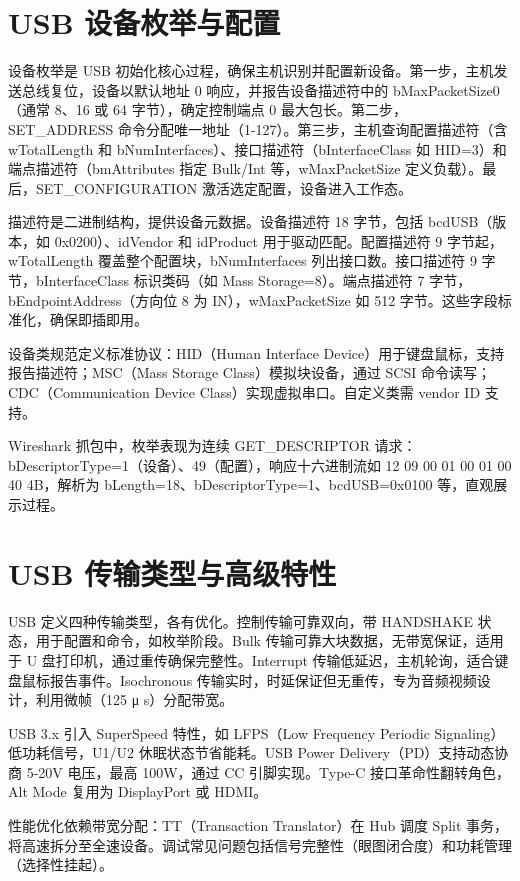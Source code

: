\chapter{USB 设备枚举与配置}
设备枚举是 USB 初始化核心过程，确保主机识别并配置新设备。第一步，主机发送总线复位，设备以默认地址 0 响应，并报告设备描述符中的 bMaxPacketSize0（通常 8、16 或 64 字节），确定控制端点 0 最大包长。第二步，SET\_{}ADDRESS 命令分配唯一地址（1-127）。第三步，主机查询配置描述符（含 wTotalLength 和 bNumInterfaces）、接口描述符（bInterfaceClass 如 HID=3）和端点描述符（bmAttributes 指定 Bulk/Int 等，wMaxPacketSize 定义负载）。最后，SET\_{}CONFIGURATION 激活选定配置，设备进入工作态。\par
描述符是二进制结构，提供设备元数据。设备描述符 18 字节，包括 bcdUSB（版本，如 0x0200）、idVendor 和 idProduct 用于驱动匹配。配置描述符 9 字节起，wTotalLength 覆盖整个配置块，bNumInterfaces 列出接口数。接口描述符 9 字节，bInterfaceClass 标识类码（如 Mass Storage=8）。端点描述符 7 字节，bEndpointAddress（方向位 8 为 IN），wMaxPacketSize 如 512 字节。这些字段标准化，确保即插即用。\par
设备类规范定义标准协议：HID（Human Interface Device）用于键盘鼠标，支持报告描述符；MSC（Mass Storage Class）模拟块设备，通过 SCSI 命令读写；CDC（Communication Device Class）实现虚拟串口。自定义类需 vendor ID 支持。\par
Wireshark 抓包中，枚举表现为连续 GET\_{}DESCRIPTOR 请求：bDescriptorType=1（设备）、49（配置），响应十六进制流如 12 09 00 01 00 01 00 40 4B，解析为 bLength=18、bDescriptorType=1、bcdUSB=0x0100 等，直观展示过程。\par
\chapter{USB 传输类型与高级特性}
USB 定义四种传输类型，各有优化。控制传输可靠双向，带 HANDSHAKE 状态，用于配置和命令，如枚举阶段。Bulk 传输可靠大块数据，无带宽保证，适用于 U 盘打印机，通过重传确保完整性。Interrupt 传输低延迟，主机轮询，适合键盘鼠标报告事件。Isochronous 传输实时，时延保证但无重传，专为音频视频设计，利用微帧（125 μ s）分配带宽。\par
USB 3.x 引入 SuperSpeed 特性，如 LFPS（Low Frequency Periodic Signaling）低功耗信号，U1/U2 休眠状态节省能耗。USB Power Delivery（PD）支持动态协商 5-20V 电压，最高 100W，通过 CC 引脚实现。Type-C 接口革命性翻转角色，Alt Mode 复用为 DisplayPort 或 HDMI。\par
性能优化依赖带宽分配：TT（Transaction Translator）在 Hub 调度 Split 事务，将高速拆分至全速设备。调试常见问题包括信号完整性（眼图闭合度）和功耗管理（选择性挂起）。\par
